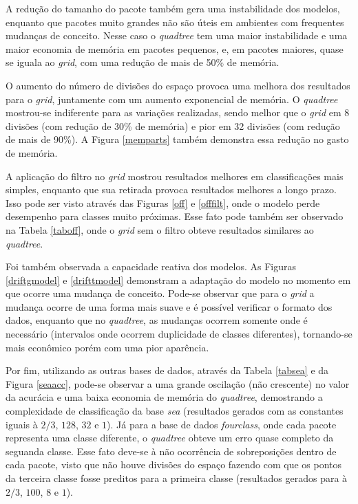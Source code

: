 \documentclass[conference]{IEEEtran}
\begin{document}
A redução do tamanho do pacote também gera uma instabilidade dos modelos, enquanto que pacotes muito grandes não são úteis em ambientes com frequentes mudanças de conceito. Nesse caso o \textit{quadtree} tem uma maior instabilidade e uma maior economia de memória em pacotes pequenos, e, em pacotes maiores, quase se iguala ao \textit{grid}, com uma redução de mais de 50\% de memória.

O aumento do número de divisões do espaço provoca uma melhora dos resultados para o \textit{grid}, juntamente com um aumento exponencial de memória. O \textit{quadtree} mostrou-se indiferente para as variações realizadas, sendo melhor que o \textit{grid} em 8 divisões (com redução de 30\% de memória) e pior em 32 divisões (com redução de mais de 90\%). A Figura \ref{memparts} também demonstra essa redução no gasto de memória.

A aplicação do filtro no \textit{grid} mostrou resultados melhores em classificações mais simples, enquanto que sua retirada provoca resultados melhores a longo prazo. Isso pode ser visto através das Figuras \ref{off} e \ref{offfilt}, onde o modelo perde desempenho para classes muito próximas. Esse fato pode também ser observado na Tabela \ref{taboff}, onde o \textit{grid} sem o filtro obteve resultados similares ao \textit{quadtree}.

Foi também observada a capacidade reativa dos modelos. As Figuras \ref{driftgmodel} e \ref{drifttmodel} demonstram a adaptação do modelo no momento em que ocorre uma mudança de conceito. Pode-se observar que para o \textit{grid} a mudança ocorre de uma forma mais suave e é possível verificar o formato dos dados, enquanto que no \textit{quadtree}, as mudanças ocorrem somente onde é necessário (intervalos onde ocorrem duplicidade de classes diferentes), tornando-se mais econômico porém com uma pior aparência.

Por fim, utilizando as outras bases de dados, através da Tabela \ref{tabsea} e da Figura \ref{seaacc}, pode-se observar a uma grande oscilação (não crescente) no valor da acurácia e uma baixa economia de memória do \textit{quadtree}, demostrando a complexidade de classificação da base \textit{sea} (resultados gerados com as constantes iguais à $2/3$, $128$, $32$ e $1$). Já para a base de dados \textit{fourclass}, onde cada pacote representa uma classe diferente, o \textit{quadtree} obteve um erro quase completo da seguanda classe. Esse fato deve-se à não ocorrência de sobreposições dentro de cada pacote, visto que não houve divisões do espaço fazendo com que os pontos da terceira classe fosse preditos para a primeira classe (resultados gerados para à $2/3$, $100$, $8$ e $1$).
\end{document}
